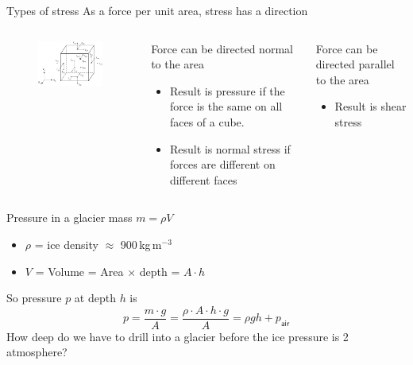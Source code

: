 \documentclass[hide notes,intlimits,unknownkeysallowed]{beamer}
\begin{document}
\begin{frame}{Types of stress}
  As a force per unit area, stress has a direction
  \begin{columns}
    \column[c]{5cm}
    \begin{figure}
      \includegraphics[width=4.75cm]{fig_3_08}
    \end{figure}
    \column[c]{6.5cm}
   \begin{block}{}
      Force can be directed normal to the area
      \begin{itemize}
      \item Result is \alert{pressure} if the force is the same on all faces of a cube.
      \item Result is \alert{normal stress} if forces are different on different faces
      \end{itemize}
    \end{block}
    \begin{block}{} 
      Force can be directed parallel to the area
      \begin{itemize}
      \item Result is \alert{shear stress}
      \end{itemize}
    \end{block}
  \end{columns}
\end{frame}

\begin{frame}{Pressure in a glacier}
  mass $m = \rho V$
     \begin{itemize}
      \item $\rho$ = ice density $\approx$ 900\,kg\,m$^{-3}$
      \item$V$ = Volume = Area $\times$ depth = $A \cdot h$
     \end{itemize}
     So pressure $p$ at depth $h$ is
     \begin{displaymath}
       p = \frac{m \cdot g}{A} = \frac{\rho \cdot A \cdot h \cdot g}{A} = \rho g h + p_{\textsf{air}}
     \end{displaymath}
     How deep do we have to drill into a glacier before the ice pressure is 2 atmosphere?
\end{frame}
\end{document}
